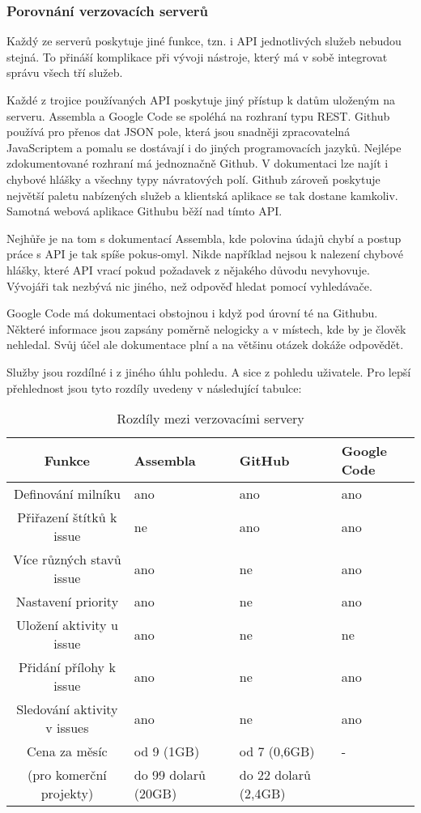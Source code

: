 \subsubsection{Porovnání verzovacích serverů}

Každý ze serverů poskytuje jiné funkce, tzn. i API jednotlivých služeb nebudou stejná. To přináší komplikace při vývoji nástroje, který má v sobě integrovat správu všech tří služeb.

Každé z trojice používaných API poskytuje jiný přístup k datům uloženým na serveru. Assembla a Google Code se spoléhá na rozhraní typu REST\cite{rest}. Github používá pro přenos dat JSON\cite{json} pole, která jsou snadněji zpracovatelná JavaScriptem a pomalu se dostávají i do jiných programovacích jazyků. Nejlépe zdokumentované rozhraní má jednoznačně Github. V dokumentaci lze najít i chybové hlášky a všechny typy návratových polí. Github zároveň poskytuje největší paletu nabízených služeb a klientská aplikace se tak dostane kamkoliv. Samotná webová aplikace Githubu běží nad tímto API.

Nejhůře je na tom s dokumentací Assembla, kde polovina údajů chybí a postup práce s API je tak spíše pokus-omyl. Nikde například nejsou k nalezení chybové hlášky, které API vrací pokud požadavek z nějakého důvodu nevyhovuje. Vývojáři tak nezbývá nic jiného, než odpověď hledat pomocí vyhledávače.

Google Code má dokumentaci obstojnou i když pod úrovní té na Githubu. Některé informace jsou zapsány poměrně nelogicky a v místech, kde by je člověk nehledal. Svůj účel ale dokumentace plní a na většinu otázek dokáže odpovědět.

Služby jsou rozdílné i z jiného úhlu pohledu. A sice z pohledu uživatele. Pro lepší přehlednost jsou tyto rozdíly uvedeny v následující tabulce:

\begin{table}
\begin{center}
	\begin{tabular}{|c||l|l|l|}
	\hline
	Funkce & Assembla & GitHub & Google Code \\
	\hline
	Definování milníku & ano & ano & ano \\
	Přiřazení štítků k issue & ne & ano & ano \\
	Více různých stavů issue & ano & ne & ano \\
	Nastavení priority & ano & ne & ano \\
	Uložení aktivity u issue & ano & ne & ne \\
	Přidání přílohy k issue & ano & ne & ano \\
	Sledování aktivity v issues & ano & ne & ano \\
	\hline
	Cena za měsíc & od 9 (1GB) & od 7 (0,6GB) & - \\
	(pro komerční projekty) & do 99 dolarů (20GB) & do 22 dolarů (2,4GB) & \\
	\hline
	\end{tabular}
\end{center}
\caption{Rozdíly mezi verzovacími servery}
\label{tab:versionSystemsDifference}
\end{table}

